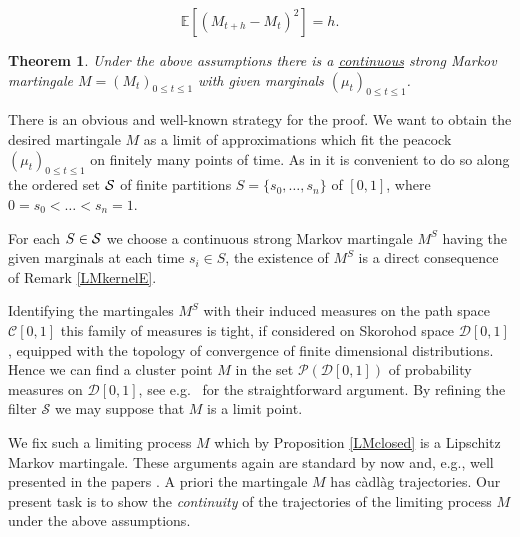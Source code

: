 \documentclass[11pt,a4paper]{article}%
\def\E{{\mathbb E}}
\newtheorem{theorem}{Theorem}[section]
\numberwithin{equation}{section}
\begin{document}
\begin{equation} \label{1/n}
\E \left[\left(M_{t+h} - M_t \right)^2\right] = h.
\end{equation}


\begin{theorem}\label{cont}
Under the above assumptions there is a \underline{continuous} strong Markov martingale $M = (M_t)_{0 \le t \le 1}$ with given marginals $ (\mu_t)_{0 \le t \le 1}$.
\end{theorem}

There is an obvious and well-known strategy for the proof. We want to obtain the desired martingale $M$ as a limit of approximations which fit the peacock $(\mu_t)_{0 \le t \le 1}$ on finitely many points of time. As in \cite{HiRoYo14} it is convenient to do so along the ordered set $\cal S$ of finite partitions $ S = \{s_0,\dots,s_n\} $ of $[0,1]$, where $0 = s_0 < \dots < s_n =1$.



 For each $S \in \cal S$ we choose a continuous strong Markov martingale $M^S$ having the given marginals at each time $s_i \in S$, the existence of  $M^S$  is a direct consequence of Remark \ref{LMkernelE}. %
 
Identifying the martingales $M^S$ with their induced measures on the path space $\mathcal C[0,1]$ this family of measures is tight, if considered on Skorohod space $\mathcal D[0,1]$, equipped with the topology of convergence of finite dimensional distributions.
Hence we can find a cluster point $M$ in the set $\mathcal P(\mathcal D[0,1])$ of probability measures on $\mathcal D[0,1]$, see e.g.\ \cite{BeHuSt16} for the straightforward argument.
By refining the filter $\mathcal S$ we may suppose that $M$ is a limit point. 

We fix such a limiting process $M$ which by  Proposition \ref{LMclosed} is a Lipschitz Markov martingale.
These arguments again are standard by now and, e.g., well presented in the papers \cite{HiRoYo14, BeHuSt16}.
A priori the martingale $M$ has c\`adl\`ag trajectories.
Our present task is to show the \textit{continuity} of the trajectories of the limiting process $M$ under the above assumptions.
\end{document}
